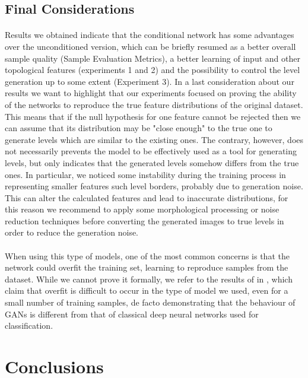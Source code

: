  
\subsection{Final Considerations}
\paragraph{} Results we obtained indicate that the conditional network has some advantages over the unconditioned version, which can be briefly resumed as a better overall sample quality (Sample Evaluation Metrics), a better learning of input and other topological features (experiments 1 and 2) and the possibility to control the level generation up to some extent (Experiment 3). In a last consideration about our results we want to highlight that our experiments focused on proving the ability of the networks to reproduce the true feature distributions of the original dataset. This means that if the null hypothesis for one feature cannot be rejected then we can assume that its distribution may be "close enough" to the true one to generate levels which are similar to the existing ones. The contrary, however, does not necessarily prevents the model to be effectively used as a tool for generating levels, but only indicates that the generated levels somehow differs from the true ones. In particular, we noticed some instability during the training process in representing smaller features such level borders, probably due to generation noise. This can alter the calculated features and lead to inaccurate distributions, for this reason we recommend to apply some morphological processing or noise reduction techniques before converting the generated images to true levels in order to reduce the generation noise.

\paragraph{} When using this type of models, one of the most common concerns is that the network could overfit the training set, learning to reproduce samples from the dataset. While we cannot prove it formally, we refer to the results of \citeauthor{empiricalevaluation} in \cite[Appendix~C]{empiricalevaluation}, which claim that overfit is difficult to occur in the type of model we used, even for a small number of training samples, de facto demonstrating that the behaviour of GANs is different from that of classical deep neural networks used for classification.

\section{Conclusions}
\label{sec:conclusions}
